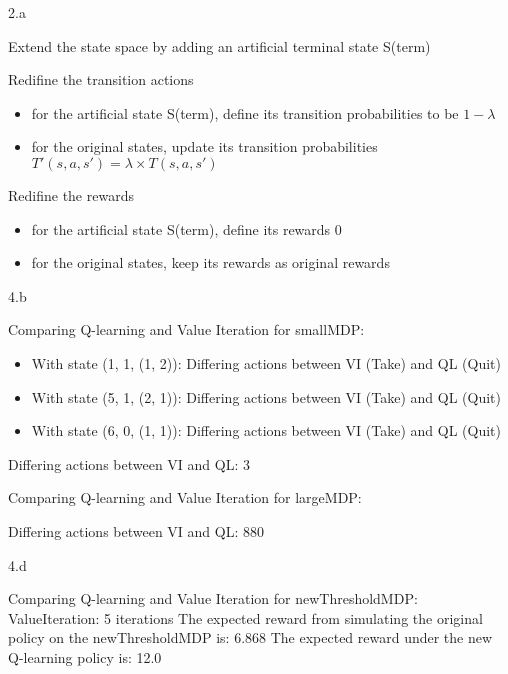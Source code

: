 \LARGE
2.a
\normalsize

\begin{answer}
  Extend the state space by adding an artificial terminal state S(term)

  Redifine the transition actions
  \begin{itemize}
    \item for the artificial state S(term), define its transition probabilities to be $1-\lambda$ 
    \item for the original states, update its transition probabilities $T'(s,a,s')=\lambda\times T(s,a,s')$
  \end{itemize}

  Redifine the rewards
  \begin{itemize}
    \item for the artificial state S(term), define its rewards $0$ 
    \item for the original states, keep its rewards as original rewards
  \end{itemize}
\end{answer}
\clearpage

\LARGE
4.b
\normalsize

\begin{answer}
  Comparing Q-learning and Value Iteration for smallMDP:

  \begin{itemize}
    \item With state (1, 1, (1, 2)): Differing actions between VI (Take) and QL (Quit)
    \item With state (5, 1, (2, 1)): Differing actions between VI (Take) and QL (Quit)
    \item With state (6, 0, (1, 1)): Differing actions between VI (Take) and QL (Quit)
  \end{itemize}

  Differing actions between VI and QL: 3


  Comparing Q-learning and Value Iteration for largeMDP:

  Differing actions between VI and QL: 880
\end{answer}
\clearpage

\LARGE
4.d
\normalsize

\begin{answer}
  Comparing Q-learning and Value Iteration for newThresholdMDP:
  ValueIteration: 5 iterations
  The expected reward from simulating the original policy on the newThresholdMDP is: 6.868
  The expected reward under the new Q-learning policy is: 12.0
\end{answer}
\clearpage

